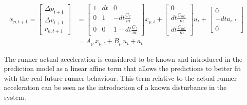 \documentclass[a4paper,12pt,oneside]{book}
\begin{document}
\begin{equation}
\begin{aligned}
    x_{p,t+1} = 
        \begin{bmatrix}
            \Delta p_{t+1}  \\
            \Delta v_{t+1} \\
            v_{k,t+1}
        \end{bmatrix}
        & =
        \begin{bmatrix}
            1 & dt & 0 \\
            0 & 1 & -dt\frac{C_f}{m} \\
            0 & 0 & 1-dt\frac{C_f}{m}
        \end{bmatrix}
        x_{p,t}
        +
        \begin{bmatrix}
            0 \\
            dt \frac{C_{m1}}{m} \\
            dt \frac{C_{m1}}{m}
        \end{bmatrix}
        u_t + 
        \begin{bmatrix}
        0 \\
        - dt a_{r,t} \\
        0
        \end{bmatrix} \\
        & = A_p \, x_{p,t} + B_p \, u_t + a_t
\end{aligned}
\label{Prediction_model_MPC}
\end{equation}

The runner actual acceleration is considered to be known and introduced in the prediction model as a linear affine term that allows the predictions to better fit with the real future runner behaviour.
This term relative to the actual runner acceleration can be seen as the introduction of a known disturbance in the system.
\end{document}

